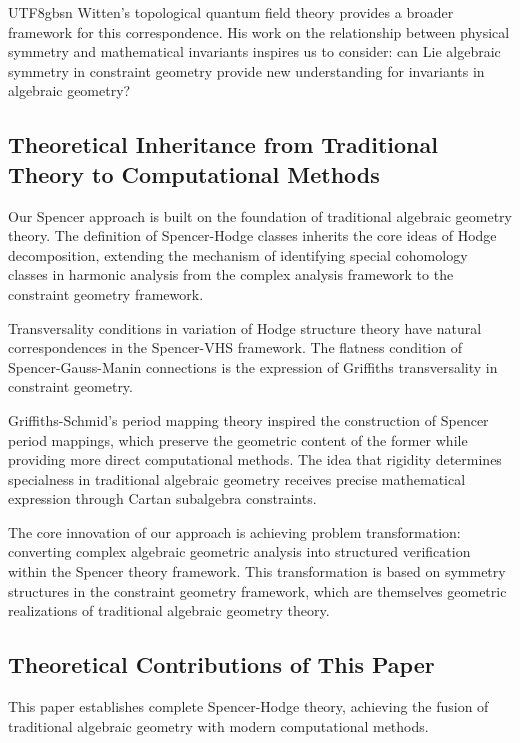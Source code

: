 \documentclass[a4paper,12pt]{extarticle}
\theoremstyle{definition}
\begin{document}
\begin{CJK}{UTF8}{gbsn}
Witten's topological quantum field theory\cite{witten1988topological} provides a broader framework for this correspondence. His work on the relationship between physical symmetry and mathematical invariants inspires us to consider: can Lie algebraic symmetry in constraint geometry provide new understanding for invariants in algebraic geometry?

\subsection{Theoretical Inheritance from Traditional Theory to Computational Methods}
\label{subsec:traditional_wisdom_computational_innovation}

Our Spencer approach is built on the foundation of traditional algebraic geometry theory. The definition of Spencer-Hodge classes inherits the core ideas of Hodge decomposition, extending the mechanism of identifying special cohomology classes in harmonic analysis from the complex analysis framework to the constraint geometry framework.

Transversality conditions in variation of Hodge structure theory have natural correspondences in the Spencer-VHS framework. The flatness condition of Spencer-Gauss-Manin connections is the expression of Griffiths transversality in constraint geometry.

Griffiths-Schmid's period mapping theory inspired the construction of Spencer period mappings, which preserve the geometric content of the former while providing more direct computational methods. The idea that rigidity determines specialness in traditional algebraic geometry receives precise mathematical expression through Cartan subalgebra constraints.

The core innovation of our approach is achieving problem transformation: converting complex algebraic geometric analysis into structured verification within the Spencer theory framework. This transformation is based on symmetry structures in the constraint geometry framework, which are themselves geometric realizations of traditional algebraic geometry theory.

\subsection{Theoretical Contributions of This Paper}
\label{subsec:theoretical_contributions}

This paper establishes complete Spencer-Hodge theory, achieving the fusion of traditional algebraic geometry with modern computational methods.


\end{CJK}
\end{document}
